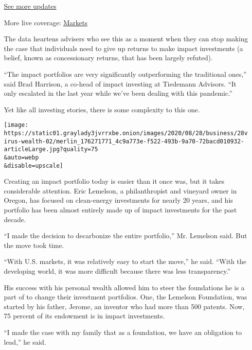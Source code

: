 \href{https://www.nytimes3xbfgragh.onion/2020/09/11/world/covid-19-coronavirus.html?action=click\&pgtype=Article\&state=default\&region=MAIN_CONTENT_1\&context=storylines_live_updates}{See
more updates}

More live coverage:
\href{https://www.nytimes3xbfgragh.onion/live/2020/09/11/business/stock-market-today-coronavirus?action=click\&pgtype=Article\&state=default\&region=MAIN_CONTENT_1\&context=storylines_live_updates}{Markets}

The data heartens advisers who see this as a moment when they can stop
making the case that individuals need to give up returns to make impact
investments (a belief, known as concessionary returns, that has been
largely refuted).

``The impact portfolios are very significantly outperforming the
traditional ones,'' said Brad Harrison, a co-head of impact investing at
Tiedemann Advisors. ``It only escalated in the last year while we've
been dealing with this pandemic.''

Yet like all investing stories, there is some complexity to this one.

\texttt{[image: https://static01.graylady3jvrrxbe.onion/images/2020/08/28/business/28virus-wealth-02/merlin\_176271771\_4c9a773e-f522-493b-9a70-72bacd010932-articleLarge.jpg?quality=75\\\&auto=webp\\\&disable=upscale]}

Creating an impact portfolio today is easier than it once was, but it
takes considerable attention. Eric Lemelson, a philanthropist and
vineyard owner in Oregon, has focused on clean-energy investments for
nearly 20 years, and his portfolio has been almost entirely made up of
impact investments for the past decade.

``I made the decision to decarbonize the entire portfolio,'' Mr.
Lemelson said. But the move took time.

``With U.S. markets, it was relatively easy to start the move,'' he
said. ``With the developing world, it was more difficult because there
was less transparency.''

His success with his personal wealth allowed him to steer the
foundations he is a part of to change their investment portfolios. One,
the Lemelson Foundation, was started by his father, Jerome, an inventor
who had more than 500 patents. Now, 75 percent of its endowment is in
impact investments.

``I made the case with my family that as a foundation, we have an
obligation to lead,'' he said.

